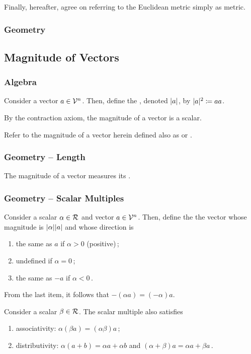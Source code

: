 Finally, hereafter, agree on referring to the Euclidean metric simply as metric.


\subsubsection{Geometry}


\subsection{Magnitude of Vectors}

\subsubsection{Algebra}
Consider a vector $a\in\mathcal{V}^{n}$. Then, define the , denoted $\lvert{a}\rvert$, by $\lvert{a}\rvert^2 \coloneqq aa$. 

By the contraction axiom, the magnitude of a vector is a scalar.

Refer to the magnitude of a vector herein defined also as  or .


\subsubsection{Geometry -- Length}
The magnitude of a vector measures its .


\subsubsection{Geometry -- Scalar Multiples}
Consider a scalar $\alpha\in\mathcal{R}$ and vector $a\in\mathcal{V}^{n}$. Then, define the  the vector whose magnitude is $\lvert{\alpha}\rvert\lvert{a}\rvert$ and whose direction is
\begin{enumerate}
\item the same as $a$ if $\alpha >0$ (positive)\,;
\item undefined if $\alpha = 0$\,;
\item the same as $-a$ if $\alpha < 0$\,.
\end{enumerate}
From the last item, it follows that $-(\alpha a) = (-\alpha)a$.

Consider a scalar $\beta\in\mathcal{R}$. The scalar multiple also satisfies
\begin{enumerate}
\item associativity: $\alpha(\beta a) = (\alpha\beta)a$\,; 
\item distributivity: $\alpha(a + b) = \alpha a + \alpha b$ and $(\alpha + \beta)a = \alpha a + \beta a$\,.
\end{enumerate}


